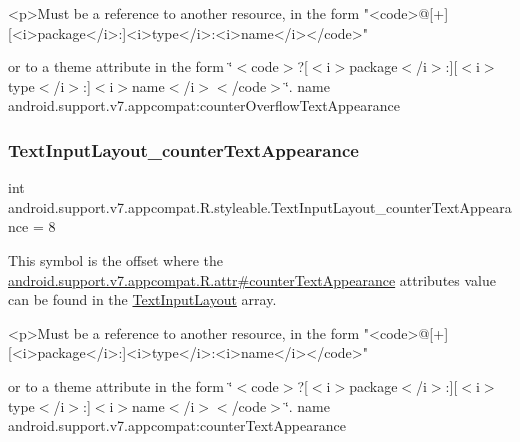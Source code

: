 \begin{DoxyVerb}      <p>Must be a reference to another resource, in the form "<code>@[+][<i>package</i>:]<i>type</i>:<i>name</i></code>"
\end{DoxyVerb}
 or to a theme attribute in the form \char`\"{}$<$code$>$?\mbox{[}$<$i$>$package$<$/i$>$\+:\mbox{]}\mbox{[}$<$i$>$type$<$/i$>$\+:\mbox{]}$<$i$>$name$<$/i$>$$<$/code$>$\char`\"{}.  name android.\+support.\+v7.\+appcompat\+:counter\+Overflow\+Text\+Appearance \mbox{\label{classandroid_1_1support_1_1v7_1_1appcompat_1_1R_1_1styleable_afb345d2fd2db6ca23ec4772a9051c0e5}} 
\subsubsection{\texorpdfstring{Text\+Input\+Layout\+\_\+counter\+Text\+Appearance}{TextInputLayout\_counterTextAppearance}}
{\footnotesize\ttfamily int android.\+support.\+v7.\+appcompat.\+R.\+styleable.\+Text\+Input\+Layout\+\_\+counter\+Text\+Appearance = 8\hspace{0.3cm}{\ttfamily [static]}}

This symbol is the offset where the \hyperlink{classandroid_1_1support_1_1v7_1_1appcompat_1_1R_1_1attr_a86b164196b84bd8f7b817acc52c5fba9}{android.\+support.\+v7.\+appcompat.\+R.\+attr\#counter\+Text\+Appearance} attribute\textquotesingle{}s value can be found in the \hyperlink{classandroid_1_1support_1_1v7_1_1appcompat_1_1R_1_1styleable_a618db13ebe8aab96f9d951a0d1c7d5bc}{Text\+Input\+Layout} array.

\begin{DoxyVerb}      <p>Must be a reference to another resource, in the form "<code>@[+][<i>package</i>:]<i>type</i>:<i>name</i></code>"
\end{DoxyVerb}
 or to a theme attribute in the form \char`\"{}$<$code$>$?\mbox{[}$<$i$>$package$<$/i$>$\+:\mbox{]}\mbox{[}$<$i$>$type$<$/i$>$\+:\mbox{]}$<$i$>$name$<$/i$>$$<$/code$>$\char`\"{}.  name android.\+support.\+v7.\+appcompat\+:counter\+Text\+Appearance \mbox{\label{classandroid_1_1support_1_1v7_1_1appcompat_1_1R_1_1styleable_abce6bca775196b0f23b9f0f81ac9bd70}} 
